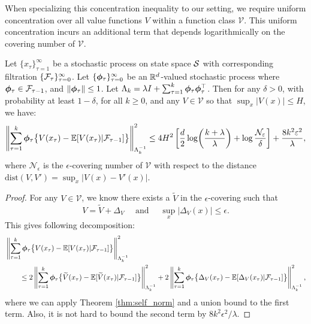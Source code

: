 When specializing this concentration inequality to our setting, we require uniform concentration over all value functions $V$ within a function class $\mathcal{V}$. This uniform concentration incurs an additional term that depends logarithmically on the covering number of $\mathcal{V}$.
\begin{lemma}\label{lem:self_norm_covering}
Let $\{x_\tau\}_{\tau = 1}^\infty$ be a stochastic process on state space $\mathcal{S}$ with corresponding filtration $\{\mathcal{F}_\tau\}_{\tau = 0}^\infty$. Let $\{\bm{\phi}_\tau\}_{\tau = 0}^\infty$ be an $\mathbb{R}^d$-valued stochastic process where $\bm{\phi}_\tau \in \mathcal{F}_{\tau-1}$, and $\left\|{\bm{\phi}_\tau}\right\| \le 1$. Let $\Lambda_k = \lambda I + \sum_{\tau=1}^k \bm{\phi}_\tau \bm{\phi}_\tau^{\top}$. Then for any $\delta >0$, with probability at least $1-\delta$, for all $k \ge 0$, and any $V \in \mathcal{V}$ so that $\sup_x |V(x)| \le H$, we have:
\begin{equation*} 
\left\|{\sum_{\tau = 1}^k \bm{\phi}_\tau  \bigl \{ V(x_\tau) - \mathbb{E}[V(x_\tau)|\mathcal{F}_{\tau-1}] \bigr \} }\right\|^2_{\Lambda_k^{-1}}
\le 4H^2 \left[ \frac{d}{2}\log\biggl( \frac{k+\lambda}{\lambda}\biggr )  + \log\frac{\mathcal{N}_{\varepsilon}}{\delta}\right]  + \frac{8k^2\varepsilon^2}{\lambda}, 
\end{equation*}
where $\mathcal{N}_{\epsilon}$ is the $\epsilon$-covering number of $\mathcal{V}$ with respect to the distance $\mathrm{dist}(V, V') = \sup_{x} |V(x) - V'(x)|$.
\end{lemma}



\begin{proof}
For any $V \in \mathcal{V}$, we know there exists a $\tilde{V}$ in the $\epsilon$-covering such that
\begin{equation*}
V = \tilde{V} + \Delta_V \quad\text{~and~}\quad \sup_x |\Delta_V(x)| \le \epsilon. 
\end{equation*}
This gives following decomposition:
\begin{align*}
&\left\|{\sum_{\tau = 1}^k \bm{\phi}_\tau \bigl \{ V(x_\tau) - \mathbb{E}[V(x_\tau)|\mathcal{F}_{\tau-1}]\bigr \}  }\right\|^2_{\Lambda_k^{-1}}\\
&\qquad \le  2\left\|{\sum_{\tau = 1}^k \bm{\phi}_\tau \big\{ \widetilde{V}(x_\tau) - \mathbb{E}[\widetilde{V}(x_\tau)|\mathcal{F}_{\tau-1}] \bigr \} }\right\|^2_{\Lambda_k^{-1}}
+ 2\left\|{\sum_{\tau = 1}^k \bm{\phi}_\tau \bigl \{ \Delta_V(x_\tau) - \mathbb{E}[\Delta_V(x_\tau)|\mathcal{F}_{\tau-1}]\bigr \} }\right\|^2_{\Lambda_k^{-1}},
\end{align*}
where we can apply Theorem \ref{thm:self_norm} and a union bound to the first term. Also, it is not hard to bound the second term by $8k^2\epsilon^2/\lambda$.
\end{proof}


